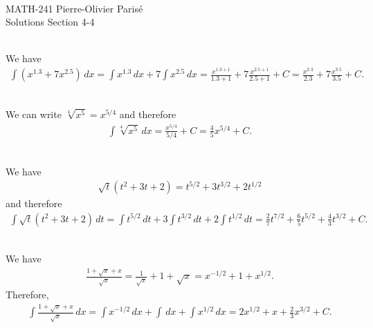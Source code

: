 


	\noindent \hrulefill \\
	MATH-241 \hfill Pierre-Olivier Paris{\'e}\\
	Solutions Section 4-4 \hfill \semester \\\vspace*{-1cm}
	
	\noindent\hrulefill
	
	\spc	
	
	\\
	We have
		\begin{align*}
		\int (x^{1.3} + 7x^{2.5}) \, dx = \int x^{1.3} \, dx + 7 \int x^{2.5} \, dx = \frac{x^{1.3 + 1}}{1.3 + 1} + 7 \frac{x^{2.5 + 1}}{2.5 + 1} + C = \frac{x^{2.3}}{2.3} + 7 \frac{x^{3.5}}{3.5} + C .
		\end{align*}
		
	\spc
	
	\\
	We can write $\sqrt[4]{x^5} = x^{5/4}$ and therefore
		\begin{align*}
		\int \sqrt[4]{x^5} \, dx = \frac{x^{5/4}}{5/4} + C = \frac{4}{5} x^{5/4} + C .
		\end{align*}
		
	\spc
	
	\\
	We have
		\begin{align*}
		\sqrt{t} (t^2 + 3t + 2) = t^{5/2} + 3 t^{3/2} + 2t^{1/2}
		\end{align*}
	and therefore
		\begin{align*}
		\int \sqrt{t} (t^2 + 3t + 2) \, dt = \int t^{5/2} \, dt + 3 \int t^{3/2} \, dt + 2 \int t^{1/2} \, dt = \frac{2}{7} t^{7/2} + \frac{6}{5} t^{5/2} + \frac{4}{3} t^{3/2} + C .
		\end{align*}
	
	\spc
	
	\\
	
	We have
		\begin{align*}
		\frac{1 + \sqrt{x} + x}{\sqrt{x}} = \frac{1}{\sqrt{x}} + 1 + \sqrt{x} = x^{-1/2} + 1 + x^{1/2} .
		\end{align*}
	Therefore, 
		\begin{align*}
		\int \frac{1 + \sqrt{x} + x}{\sqrt{x}} \, dx = \int x^{-1/2} \, dx + \int \, dx + \int x^{1/2} \, dx = 2 x^{1/2} + x + \frac{2}{3} x^{3/2} + C .
\end{align*}

